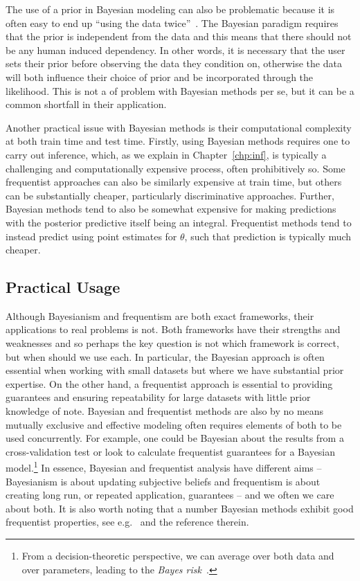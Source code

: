 The use of a prior in Bayesian modeling can also be problematic because it is often easy to end up 
``using the data twice''~\citep{gelman2008objections}.  The Bayesian paradigm requires that the
prior is independent from the data and this means that there should not be any human induced
dependency.  In other words, it is necessary that the user sets their prior before
observing the data they condition on, otherwise the data will both influence their choice of prior
and be incorporated through the likelihood.  This is not a of problem with Bayesian 
methods per se, but it can be a common shortfall in their application.

Another practical issue with Bayesian methods is their computational complexity at both
train time and test time.  Firstly, using Bayesian methods requires one to carry out inference,
which, as we explain in Chapter~\ref{chp:inf}, is typically a challenging and computationally
expensive process, often prohibitively so.  Some frequentist approaches can also
be similarly expensive at train time, but others can be substantially cheaper, particularly
discriminative approaches.  Further, Bayesian methods tend to also be somewhat expensive
for making predictions with the posterior predictive itself being an integral.  Frequentist
methods tend to instead predict using point estimates for $\theta$, such that prediction is typically
much cheaper.

\subsection{Practical Usage}
\label{sec:bayes:religion:correct}

Although Bayesianism and frequentism are both exact frameworks, their applications to real problems is not.
Both frameworks have their strengths and weaknesses and so perhaps the key question is not which framework
is correct, but when should we use each.  In
particular, the Bayesian approach is often essential when working with small datasets but where we have substantial
prior expertise.  On the other hand, a frequentist approach is essential to providing guarantees and ensuring repeatability for large
datasets with little prior knowledge of note.  Bayesian and frequentist methods are also by no means mutually 
exclusive and effective modeling often requires elements of both
to be used concurrently.  
For example, one could be Bayesian about the results from a cross-validation test or look to calculate
frequentist guarantees for a Bayesian model.\footnote{From a decision-theoretic perspective, we can
average over both data and over parameters, leading to the \emph{Bayes risk}~\citep{robert2007bayesian}.}
In essence, Bayesian and frequentist analysis have different aims -- Bayesianism is about updating
subjective beliefs and frequentism is about creating long run, or repeated application, guarantees -- 
and we often we care about both.  It is also worth noting that a number Bayesian methods exhibit
good frequentist properties, see e.g.~\cite{mcallester2013pac} and the reference therein.


